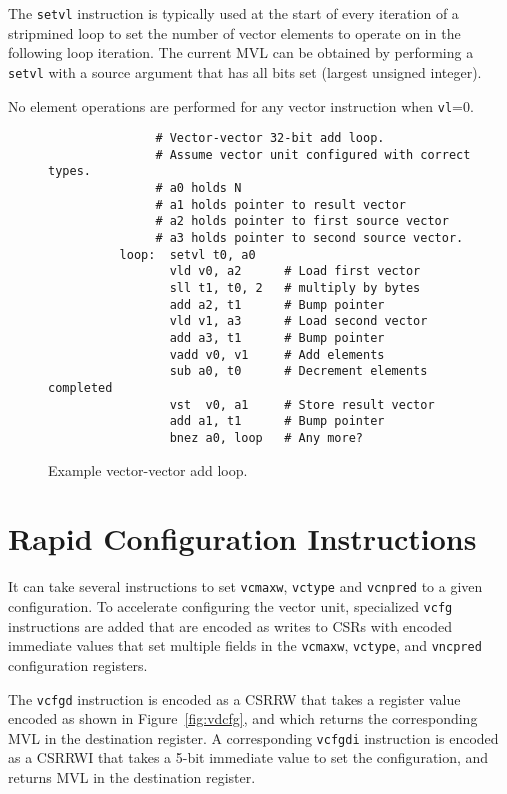 The {\tt setvl} instruction is typically used at the start of every
iteration of a stripmined loop to set the number of vector elements to
operate on in the following loop iteration.  The current MVL can be
obtained by performing a {\tt setvl} with a source argument that has
all bits set (largest unsigned integer).

No element operations are performed for any vector instruction when
{\tt vl}=0.

\begin{figure}[bt]
  \centering
\begin{verbatim}
               # Vector-vector 32-bit add loop.
               # Assume vector unit configured with correct types.
               # a0 holds N
               # a1 holds pointer to result vector
               # a2 holds pointer to first source vector
               # a3 holds pointer to second source vector.
          loop:  setvl t0, a0
                 vld v0, a2      # Load first vector
                 sll t1, t0, 2   # multiply by bytes
                 add a2, t1      # Bump pointer
                 vld v1, a3      # Load second vector
                 add a3, t1      # Bump pointer
                 vadd v0, v1     # Add elements
                 sub a0, t0      # Decrement elements completed
                 vst  v0, a1     # Store result vector
                 add a1, t1      # Bump pointer
                 bnez a0, loop   # Any more?
\end{verbatim}
\caption{Example vector-vector add loop.}
\label{fig:vvadd}
\end{figure}

\section{Rapid Configuration Instructions}

It can take several instructions to set {\tt vcmaxw}, {\tt vctype} and
{\tt vcnpred} to a given configuration.  To accelerate configuring the
vector unit, specialized {\tt vcfg} instructions are added that are
encoded as writes to CSRs with encoded immediate values that set
multiple fields in the {\tt vcmaxw}, {\tt vctype}, and {\tt vncpred}
configuration registers.

The {\tt vcfgd} instruction is encoded as a CSRRW that takes a
register value encoded as shown in Figure~\ref{fig:vdcfg}, and which
returns the corresponding MVL in the destination register.  A
corresponding {\tt vcfgdi} instruction is encoded as a CSRRWI that
takes a 5-bit immediate value to set the configuration, and returns
MVL in the destination register.

